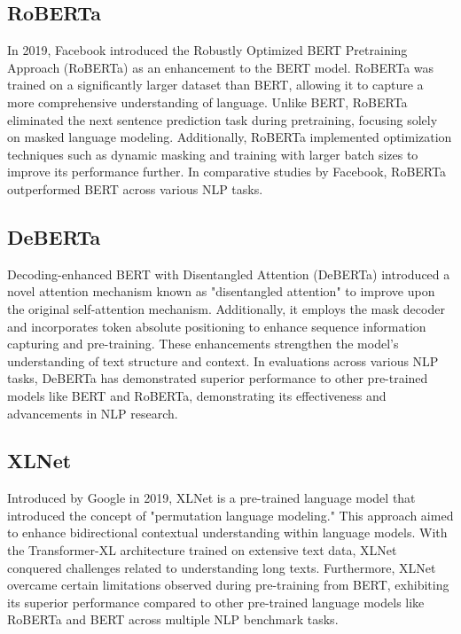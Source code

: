 \subsection{RoBERTa}
In 2019, Facebook introduced the Robustly Optimized BERT Pretraining Approach (RoBERTa)\cite{b23} as an enhancement to the BERT model. RoBERTa was trained on a significantly larger dataset than BERT, allowing it to capture a more comprehensive understanding of language. Unlike BERT, RoBERTa eliminated the next sentence prediction task during pretraining, focusing solely on masked language modeling. Additionally, RoBERTa implemented optimization techniques such as dynamic masking and training with larger batch sizes to improve its performance further. In comparative studies by Facebook, RoBERTa outperformed BERT across various NLP tasks.

\subsection{DeBERTa}
Decoding-enhanced BERT with Disentangled Attention (DeBERTa)\cite{b24}  introduced a novel attention mechanism known as "disentangled attention" to improve upon the original self-attention mechanism. Additionally, it employs the mask decoder and incorporates token absolute positioning to enhance sequence information capturing and pre-training. These enhancements strengthen the model's understanding of text structure and context. In evaluations across various NLP tasks, DeBERTa has demonstrated superior performance to other pre-trained models like BERT and RoBERTa, demonstrating its effectiveness and advancements in NLP research.

\subsection{XLNet}
Introduced by Google in 2019, XLNet\cite{b25} is a pre-trained language model that introduced the concept of "permutation language modeling." This approach aimed to enhance bidirectional contextual understanding within language models. With the Transformer-XL architecture trained on extensive text data, XLNet conquered challenges related to understanding long texts. Furthermore, XLNet overcame certain limitations observed during pre-training from BERT, exhibiting its superior performance compared to other pre-trained language models like RoBERTa and BERT across multiple NLP benchmark tasks.

